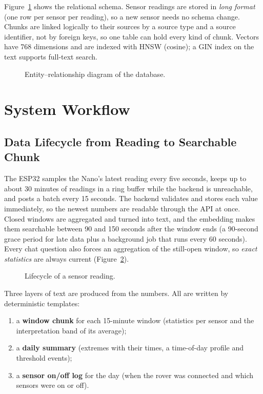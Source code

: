 Figure~\ref{fig:er} shows the relational schema. Sensor readings are stored in \emph{long format} (one row per sensor per
reading), so a new sensor needs no schema change. Chunks are linked logically to their sources by a source type and a source
identifier, not by foreign keys, so one table can hold every kind of chunk. Vectors have 768 dimensions and are indexed with
HNSW (cosine); a GIN index on the text supports full-text search.

\begin{figure}[H]
\centering

\caption{Entity--relationship diagram of the database.}
\label{fig:er}
\end{figure}

\section{System Workflow}

\subsection{Data Lifecycle from Reading to Searchable Chunk}

The ESP32 samples the Nano's latest reading every five seconds, keeps up to about 30 minutes of readings in a ring buffer while
the backend is unreachable, and posts a batch every 15 seconds. The backend validates and stores each value immediately, so the
newest numbers are readable through the API at once. Closed windows are aggregated and turned into text, and the
embedding makes them searchable between 90 and 150 seconds after the window ends (a 90-second grace period for late data
plus a background job that runs every 60 seconds). Every chat question also forces an aggregation of the still-open window, so
\emph{exact statistics} are always current (Figure~\ref{fig:lifecycle}).

\begin{figure}[H]
\centering

\caption{Lifecycle of a sensor reading.}
\label{fig:lifecycle}
\end{figure}

Three layers of text are produced from the numbers. All are written by deterministic templates:

\begin{enumerate}
\item a \textbf{window chunk} for each 15-minute window (statistics per sensor and the interpretation band of its average);
\item a \textbf{daily summary} (extremes with their times, a time-of-day profile and threshold events);
\item a \textbf{sensor on/off log} for the day (when the rover was connected and which sensors were on or off).
\end{enumerate}

